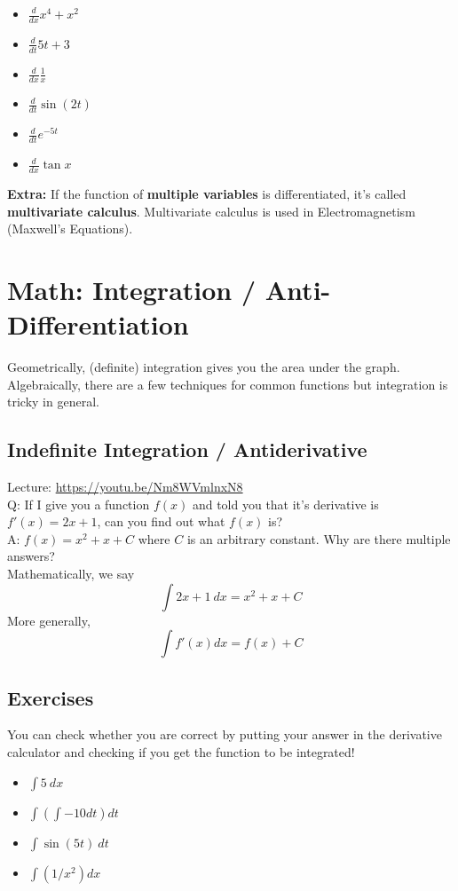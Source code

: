 \documentclass{article}
\begin{document}
\begin{itemize}
    \item $\frac{d}{dx} x^4 + x^2$
    \item $\frac{d}{dt} 5t + 3$
    \item $\frac{d}{dx} \frac{1}{x}$
    \item $\frac{d}{dt} \sin (2t)$
    \item $\frac{d}{dt} e^{-5t}$
    \item $\frac{d}{dx} \tan x$
\end{itemize}
\textbf{Extra:} If the function of \textbf{multiple variables} is differentiated, it's called \textbf{multivariate calculus}. Multivariate calculus is used in Electromagnetism (Maxwell's Equations).



\section{Math: Integration / Anti-Differentiation }

Geometrically, (definite) integration gives you the area under the graph. Algebraically, there are a few techniques for common functions but integration is tricky in general. 

\subsection{Indefinite Integration / Antiderivative}
Lecture: \url{https://youtu.be/Nm8WVmlnxN8} \\[10pt]
Q: If I give you a function $f(x)$ and told you that it's derivative is $f'(x) = 2x + 1$, can you find out what $f(x)$ is? \\
A: $f(x) = x^2 + x + C$ where $C$ is an arbitrary constant. Why are there multiple answers?\\[10pt]
Mathematically, we say $$\int 2x + 1\ dx = x^2 + x + C$$
More generally, $$\int f'(x) dx = f(x) + C$$

\subsection{Exercises}
You can check whether you are correct by putting your answer in the derivative calculator and checking if you get the function to be integrated!
\begin{itemize}
    \item $\int 5\ dx$ 
    \item $\int \left( \int -10 dt \right) dt$
    \item $\int \sin(5t) \ dt$
    \item $\int (1/x^2) dx$
\end{itemize}
\end{document}
